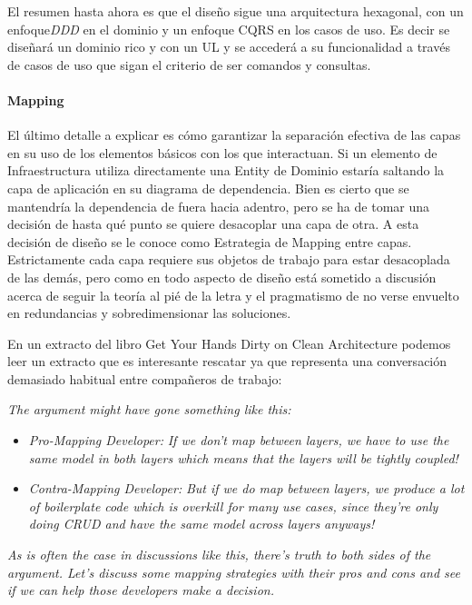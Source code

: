 El resumen hasta ahora es que el diseño sigue una arquitectura hexagonal, con un enfoque\textit{DDD} en el dominio y un enfoque CQRS en los casos de uso. Es decir se diseñará un dominio rico y con un UL y se accederá a su funcionalidad a través de casos de uso que sigan el criterio de ser comandos y consultas.

\paragraph{Mapping}

El último detalle a explicar es cómo garantizar la separación efectiva de las capas en su uso de los elementos básicos con los que interactuan. Si un elemento de Infraestructura utiliza directamente una Entity de Dominio estaría saltando la capa de aplicación en su diagrama de dependencia. Bien es cierto que se mantendría la dependencia de fuera hacia adentro, pero se ha de tomar una decisión de hasta qué punto se quiere desacoplar una capa de otra. A esta decisión de diseño se le conoce como Estrategia de Mapping entre capas. Estrictamente cada capa requiere sus objetos de trabajo para estar desacoplada de las demás, pero como en todo aspecto de diseño está sometido a discusión acerca de seguir la teoría al pié de la letra y el pragmatismo de no verse envuelto en redundancias y sobredimensionar las soluciones.

En un extracto del libro Get Your Hands Dirty on Clean Architecture\cite{TomHombergs2019GYHD} podemos leer un extracto que es interesante rescatar ya que representa una conversación demasiado habitual entre compañeros de trabajo:

\textit{ The argument might have gone something like this:}

\begin{itemize}
    \item \textit{Pro-Mapping Developer:}
    \subitem  \textit{ If we don’t map between layers, we have to use the same model in both layers which means that the layers will be tightly coupled!}
    \item \textit{Contra-Mapping Developer:}
    \subitem \textit{ But if we do map between layers, we produce a lot of boilerplate code which is overkill for many use cases, since they’re only doing CRUD and have the same model across layers anyways!}
\end{itemize}
\textit{As is often the case in discussions like this, there’s truth to both sides of the argument. Let’s discuss some mapping strategies with their pros and cons and see if we can help those developers make a decision.}

